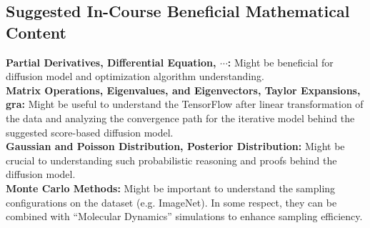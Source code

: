 \documentclass[12pt]{article}
\begin{document}
\subsection*{Suggested In-Course Beneficial Mathematical Content}
\textbf{Partial Derivatives, Differential Equation, $\cdots$: } Might be beneficial for diffusion model and optimization algorithm understanding.
\\
\textbf{Matrix Operations, Eigenvalues, and Eigenvectors, Taylor Expansions, gra: } Might be useful to understand the TensorFlow after linear transformation of the data and analyzing the convergence path for the iterative model behind the suggested score-based diffusion model.
\\
\textbf{Gaussian and Poisson Distribution, Posterior Distribution: } Might be crucial to understanding such probabilistic reasoning and proofs behind the diffusion model.
\\
\textbf{Monte Carlo Methods: } Might be important to understand the sampling configurations on the dataset (e.g. ImageNet). In some respect, they can be combined with ``Molecular Dynamics'' simulations to enhance sampling efficiency.
\end{document}
